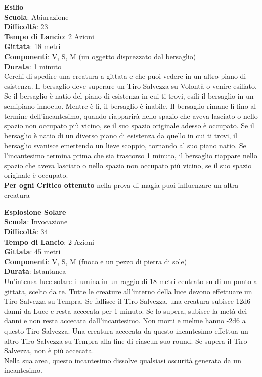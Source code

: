 \begin{multicols}{2}
\medskip\textbf{Esilio}\\
\textbf{Scuola}: Abiurazione\\
\textbf{Difficoltà}: 23\\
\textbf{Tempo di Lancio}: 2 Azioni\\
\textbf{Gittata}: 18 metri\\
\textbf{Componenti}: V, S, M (un oggetto disprezzato dal bersaglio)\\
\textbf{Durata}: 1 minuto\\
Cerchi di spedire una creatura a gittata e che puoi vedere in un altro piano di esistenza. Il bersaglio deve superare un Tiro Salvezza su Volontà o venire esiliato. Se il bersaglio è natio del piano di esistenza in cui ti trovi, esili il bersaglio in un semipiano innocuo. Mentre è lì, il bersaglio è inabile. Il bersaglio rimane lì fino al termine dell'incantesimo, quando riapparirà nello spazio che aveva lasciato o nello spazio non occupato più vicino, se il suo spazio originale adesso è occupato. Se il bersaglio è natio di un diverso piano di esistenza da quello in cui ti trovi, il bersaglio svanisce emettendo un lieve scoppio, tornando al suo piano natio. Se l'incantesimo termina prima che sia trascorso 1 minuto, il bersaglio riappare nello spazio che aveva lasciato o nello spazio non occupato più vicino, se il suo spazio originale è occupato.\\
\textbf{Per ogni Critico ottenuto} nella prova di magia puoi influenzare un altra creatura

\medskip\textbf{Esplosione Solare}\\
\textbf{Scuola}: Invocazione\\
\textbf{Difficoltà}: 34\\
\textbf{Tempo di Lancio}: 2 Azioni\\
\textbf{Gittata}: 45 metri\\
\textbf{Componenti}: V, S, M (fuoco e un pezzo di pietra di sole)\\
\textbf{Durata}: Istantanea\\
Un'intensa luce solare illumina in un raggio di 18 metri centrato su di un punto a gittata, scelto da te. Tutte le creature all'interno della luce devono effettuare un Tiro Salvezza su Tempra. Se fallisce il Tiro Salvezza, una creatura subisce 12d6 danni da Luce e resta accecata per 1 minuto. Se lo supera, subisce la metà dei danni e non resta accecata dall'incantesimo. Non morti e melme hanno -2d6 a questo Tiro Salvezza. Una creatura accecata da questo incantesimo effettua un altro Tiro Salvezza su Tempra alla fine di ciascun suo round. Se supera il Tiro Salvezza, non è più accecata.\\
Nella sua area, questo incantesimo dissolve qualsiasi oscurità generata da un incantesimo. 


\end{multicols}
